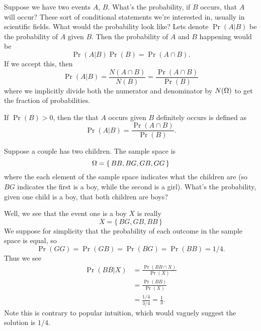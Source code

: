 \M
Suppose we have two events $A$, $B$. What's the probability, if $B$
occurs, that $A$ will occur? These sort of conditional statements we're
interested in, usually in scientific fields. What would the probability
look like? Lets denote $\Pr(A|B)$ be the probability of $A$ given
$B$. Then the probability of $A$ and $B$ happening would be
\begin{equation}
\Pr(A|B)\Pr(B)=\Pr(A\cap B).
\end{equation}
If we accept this, then
\begin{equation}
\Pr(A|B) = \frac{N(A\cap B)}{N(B)} = \frac{\Pr(A\cap B)}{\Pr(B)}
\end{equation}
where we implicitly divide both the numerator and denominator by
$N(\Omega)$ to get the fraction of probabilities.

 If $\Pr(B)>0$, then the 
that $A$ occurs given $B$ definitely occurs is defined as
\begin{equation}
\Pr(A|B)=\frac{\Pr(A\cap B)}{\Pr(B)}.
\end{equation}

Suppose a couple has two children. The sample space is
\begin{equation}
\Omega=\{\,BB,BG,GB,GG\,\}
\end{equation}
where the each element of the sample space indicates what the children
are (so $BG$ indicates the first is a boy, while the second is a
girl). What's the probability, given one child is a boy, that both
children are boys?

Well, we see that the event one is a boy $X$ is really
\begin{equation}
X=\{\,BG,GB,BB\,\}
\end{equation}
We suppose for simplicity that the probability of each outcome in the
sample space is equal, so
\begin{equation}
\Pr(GG)=\Pr(GB)=\Pr(BG)=\Pr(BB)=1/4.
\end{equation}
Thus we see
\begin{equation}
\begin{split}
\Pr(BB|X)&=\frac{\Pr(BB\cap X)}{\Pr(X)}\\
&=\frac{\Pr(BB)}{\Pr(X)}\\
&=\frac{1/4}{3/4}=\frac{1}{3}.
\end{split}
\end{equation}
Note this is contrary to popular intuition, which would vaguely suggest
the solution is $1/4$. 

